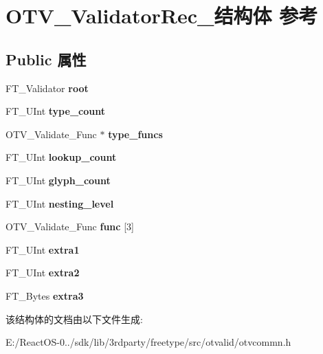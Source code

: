 \hypertarget{struct_o_t_v___validator_rec__}{}\section{O\+T\+V\+\_\+\+Validator\+Rec\+\_\+结构体 参考}
\label{struct_o_t_v___validator_rec__}
\subsection*{Public 属性}
\begin{DoxyCompactItemize}
\item 
\mbox{\label{struct_o_t_v___validator_rec___a89ef8c9a858359cd73e768add1a15d25}} 
F\+T\+\_\+\+Validator {\bfseries root}
\item 
\mbox{\label{struct_o_t_v___validator_rec___aeed5ebe706c48203dba5420a95617a82}} 
F\+T\+\_\+\+U\+Int {\bfseries type\+\_\+count}
\item 
\mbox{\label{struct_o_t_v___validator_rec___a3b4a41f08b7921e6cc2f5e4e23b5011b}} 
O\+T\+V\+\_\+\+Validate\+\_\+\+Func $\ast$ {\bfseries type\+\_\+funcs}
\item 
\mbox{\label{struct_o_t_v___validator_rec___a4e8f98560f1b7ebc022edc738ee80fae}} 
F\+T\+\_\+\+U\+Int {\bfseries lookup\+\_\+count}
\item 
\mbox{\label{struct_o_t_v___validator_rec___a4f9b4d55fb9803ac6a7b69080f8810eb}} 
F\+T\+\_\+\+U\+Int {\bfseries glyph\+\_\+count}
\item 
\mbox{\label{struct_o_t_v___validator_rec___ae2d4670d8fe74963222fc84cb987e487}} 
F\+T\+\_\+\+U\+Int {\bfseries nesting\+\_\+level}
\item 
\mbox{\label{struct_o_t_v___validator_rec___accfa14c1c69bf5b2321e6e385f69f72e}} 
O\+T\+V\+\_\+\+Validate\+\_\+\+Func {\bfseries func} \mbox{[}3\mbox{]}
\item 
\mbox{\label{struct_o_t_v___validator_rec___a3c81f375dbadb11c4a4629f917774849}} 
F\+T\+\_\+\+U\+Int {\bfseries extra1}
\item 
\mbox{\label{struct_o_t_v___validator_rec___a99781817034907744af431c7d8a38171}} 
F\+T\+\_\+\+U\+Int {\bfseries extra2}
\item 
\mbox{\label{struct_o_t_v___validator_rec___acd900be55e5a4a805eca495fe2b5e0ed}} 
F\+T\+\_\+\+Bytes {\bfseries extra3}
\end{DoxyCompactItemize}


该结构体的文档由以下文件生成\+:\begin{DoxyCompactItemize}
\item 
E\+:/\+React\+O\+S-\/0../sdk/lib/3rdparty/freetype/src/otvalid/otvcommn.\+h\end{DoxyCompactItemize}
